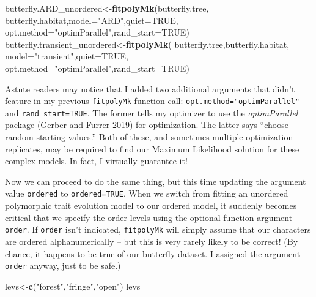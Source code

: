 \documentclass[fleqn,10pt,lineno]{wlpeerj} %
\newenvironment{Shaded}{\begin{snugshade}}{\end{snugshade}}
\newcommand{\AttributeTok}[1]{\textcolor[rgb]{0.13,0.29,0.53}{#1}}
\newcommand{\ConstantTok}[1]{\textcolor[rgb]{0.56,0.35,0.01}{#1}}
\newcommand{\FunctionTok}[1]{\textcolor[rgb]{0.13,0.29,0.53}{\textbf{#1}}}
\newcommand{\NormalTok}[1]{#1}
\newcommand{\OtherTok}[1]{\textcolor[rgb]{0.56,0.35,0.01}{#1}}
\newcommand{\StringTok}[1]{\textcolor[rgb]{0.31,0.60,0.02}{#1}}
\begin{document}
\begin{Shaded}
\begin{Highlighting}[]
\NormalTok{butterfly.ARD\_unordered}\OtherTok{\textless{}{-}}\FunctionTok{fitpolyMk}\NormalTok{(butterfly.tree,}
\NormalTok{  butterfly.habitat,}\AttributeTok{model=}\StringTok{"ARD"}\NormalTok{,}\AttributeTok{quiet=}\ConstantTok{TRUE}\NormalTok{,}
  \AttributeTok{opt.method=}\StringTok{"optimParallel"}\NormalTok{,}\AttributeTok{rand\_start=}\ConstantTok{TRUE}\NormalTok{)}
\NormalTok{butterfly.transient\_unordered}\OtherTok{\textless{}{-}}\FunctionTok{fitpolyMk}\NormalTok{(}
\NormalTok{  butterfly.tree,butterfly.habitat,}
  \AttributeTok{model=}\StringTok{"transient"}\NormalTok{,}\AttributeTok{quiet=}\ConstantTok{TRUE}\NormalTok{,}
  \AttributeTok{opt.method=}\StringTok{"optimParallel"}\NormalTok{,}\AttributeTok{rand\_start=}\ConstantTok{TRUE}\NormalTok{)}
\end{Highlighting}
\end{Shaded}

Astute readers may notice that I added two additional arguments that didn't feature in my previous \texttt{fitpolyMk} function call: \texttt{opt.method="optimParallel"} and \texttt{rand\_start=TRUE}. The former tells my optimizer to use the \emph{optimParallel} package (Gerber and Furrer 2019) for optimization. The latter says ``choose random starting values.'' Both of these, and sometimes multiple optimization replicates, may be required to find our Maximum Likelihood solution for these complex models. In fact, I virtually guarantee it!

Now we can proceed to do the same thing, but this time updating the argument value \texttt{ordered} to \texttt{ordered=TRUE}. When we switch from fitting an unordered polymorphic trait evolution model to our ordered model, it suddenly becomes critical that we specify the order levels using the optional function argument \texttt{order}. If \texttt{order} isn't indicated, \texttt{fitpolyMk} will simply assume that our characters are ordered alphanumerically -- but this is very rarely likely to be correct! (By chance, it happens to be true of our butterfly dataset. I assigned the argument \texttt{order} anyway, just to be safe.)

\begin{Shaded}
\begin{Highlighting}[]
\NormalTok{levs}\OtherTok{\textless{}{-}}\FunctionTok{c}\NormalTok{(}\StringTok{"forest"}\NormalTok{,}\StringTok{"fringe"}\NormalTok{,}\StringTok{"open"}\NormalTok{)}
\NormalTok{levs}
\end{Highlighting}
\end{Shaded}
\end{document}
